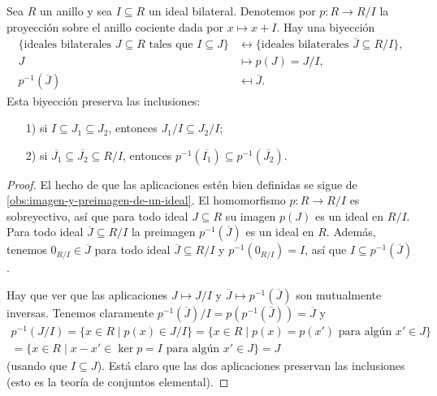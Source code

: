 \begin{teorema}
  Sea $R$ un anillo y sea $I \subseteq R$ un ideal bilateral. Denotemos por
  $p\colon R\to R/I$ la proyección sobre el anillo cociente dada por
  $x \mapsto x + I$. Hay una biyección
  \begin{align*}
    \{ \text{ideales bilaterales } J\subseteq R\text{ tales que }I\subseteq J \} & \leftrightarrow
    \{ \text{ideales bilaterales }\overline{J} \subseteq R/I \},\\
    J & \mapsto p (J) = J/I,\\
    p^{-1} (\overline{J}) & \mapsfrom \overline{J}.
  \end{align*}
  Esta biyección preserva las inclusiones:
  \begin{enumerate}
  \item[1)] si $I \subseteq J_1 \subseteq J_2$, entonces
    $J_1/I \subseteq J_2/I$;

  \item[2)] si $\overline{J_1} \subseteq \overline{J_2} \subseteq R/I$, entonces
    $p^{-1} (\overline{I_1}) \subseteq p^{-1} (\overline{J_2})$.
  \end{enumerate}

  \begin{proof}
    El hecho de que las aplicaciones estén bien definidas se sigue
    de \ref{obs:imagen-y-preimagen-de-un-ideal}. El homomorfismo
    $p\colon R\to R/I$ es sobreyectivo, así que para todo ideal $J \subseteq R$
    su imagen $p (J)$ es un ideal en $R/I$. Para todo ideal
    $\overline{J} \subseteq R/I$ la preimagen $p^{-1} (\overline{J})$ es
    un ideal en $R$. Además, tenemos $0_{R/I} \in \overline{J}$ para todo ideal
    $\overline{J} \subseteq R/I$ y $p^{-1} (0_{R/I}) = I$, así que
    $I \subseteq p^{-1} (\overline{J})$.

    Hay que ver que las aplicaciones $J \mapsto J/I$ y
    $\overline{J} \mapsto p^{-1} (\overline{J})$ son mutualmente
    inversas. Tenemos claramente
    $p^{-1} (\overline{J})/I = p (p^{-1} (\overline{J})) = \overline{J}$ y
    \begin{multline*}
      p^{-1} (J/I) =
      \{ x\in R \mid p (x) \in J/I \} =
      \{ x\in R \mid p (x) = p (x') \text{ para algún }x' \in J \} \\
      = \{ x\in R \mid x - x' \in \ker p = I \text{ para algún }x' \in J \} = J
    \end{multline*}
    (usando que $I \subseteq J$). Está claro que las dos aplicaciones preservan
    las inclusiones (esto es la teoría de conjuntos elemental).
  \end{proof}
\end{teorema}

